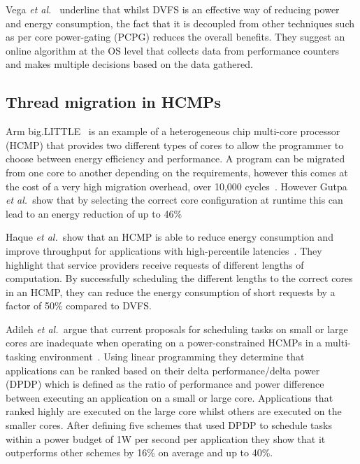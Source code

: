 Vega {\it et al.~}\cite{vega2013crank} underline that whilst DVFS is an effective way of reducing power and energy consumption, the fact that it is decoupled from other techniques such as per core power-gating (PCPG) reduces the overall benefits.
They suggest an online algorithm at the OS level that collects data from performance counters and makes multiple decisions based on the data gathered.
\vspace{-1em}
\subsection{Thread migration in HCMPs}
Arm big.LITTLE~\cite{armbig} is an example of a heterogeneous chip multi-core processor (HCMP) that provides two different types of cores to allow the programmer to choose between energy efficiency and performance.
A program can be migrated from one core to another depending on the requirements, however this comes at the cost of a very high migration overhead, over 10,000 cycles~\cite{armbig}.
However Gutpa {\it et al.~}show that by selecting the correct core configuration at runtime this can lead to an energy reduction of up to 46\%

Haque {\it et al.~}show that an HCMP is able to reduce energy consumption and improve throughput for applications with high-percentile latencies~\cite{tailAMP2017}.
They highlight that service providers receive requests of different lengths of computation.
By successfully scheduling the different lengths to the correct cores in an HCMP, they can reduce the energy consumption of short requests by a factor of 50\% compared to DVFS.

Adileh {\it et al.~}argue that current proposals for scheduling tasks on small or large cores are inadequate when operating on a power-constrained HCMPs in a multi-tasking environment~\cite{adileh2016power}.
Using linear programming they determine that applications can be ranked based on their delta performance/delta power (DPDP) which is defined as the ratio of performance and power difference between executing an application on a small or large core.
Applications that ranked highly are executed on the large core whilst others are executed on the smaller cores.
After defining five schemes that used DPDP to schedule tasks within a power budget of 1W per second per application they show that it outperforms other schemes by 16\% on average and up to 40\%.
 
